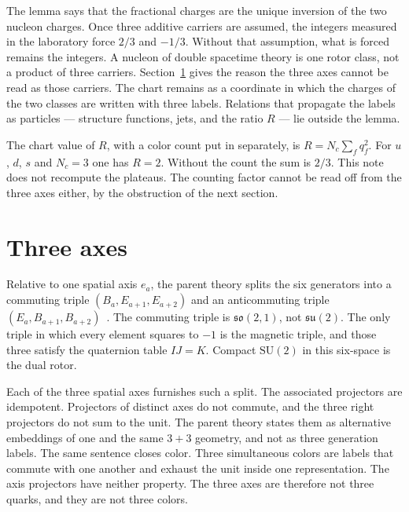 \documentclass[a4paper]{article}
\begin{document}
The lemma says that the fractional charges are the unique inversion of the two nucleon charges. Once three additive carriers are assumed, the integers measured in the laboratory force \(2/3\) and \(-1/3\). Without that assumption, what is forced remains the integers. A nucleon of double spacetime theory is one rotor class, not a product of three carriers. Section~\ref{sec:axes} gives the reason the three axes cannot be read as those carriers. The chart remains as a coordinate in which the charges of the two classes are written with three labels. Relations that propagate the labels as particles --- structure functions, jets, and the ratio \(R\) --- lie outside the lemma.

The chart value of \(R\), with a color count put in separately, is \(R=N_c\sum_f q_f^2\). For \(u\), \(d\), \(s\) and \(N_c=3\) one has \(R=2\). Without the count the sum is \(2/3\). This note does not recompute the plateaus. The counting factor cannot be read off from the three axes either, by the obstruction of the next section.

\section{Three axes}
\label{sec:axes}

Relative to one spatial axis \(e_a\), the parent theory splits the six generators into a commuting triple \((B_a,E_{a+1},E_{a+2})\) and an anticommuting triple \((E_a,B_{a+1},B_{a+2})\)~\cite{dst-main}. The commuting triple is \(\mathfrak{so}(2,1)\), not \(\mathfrak{su}(2)\). The only triple in which every element squares to \(-1\) is the magnetic triple, and those three satisfy the quaternion table \(IJ=K\). Compact \(\mathrm{SU}(2)\) in this six-space is the dual rotor.

Each of the three spatial axes furnishes such a split. The associated projectors are idempotent. Projectors of distinct axes do not commute, and the three right projectors do not sum to the unit. The parent theory states them as alternative embeddings of one and the same \(3+3\) geometry, and not as three generation labels. The same sentence closes color. Three simultaneous colors are labels that commute with one another and exhaust the unit inside one representation. The axis projectors have neither property. The three axes are therefore not three quarks, and they are not three colors.
\end{document}
